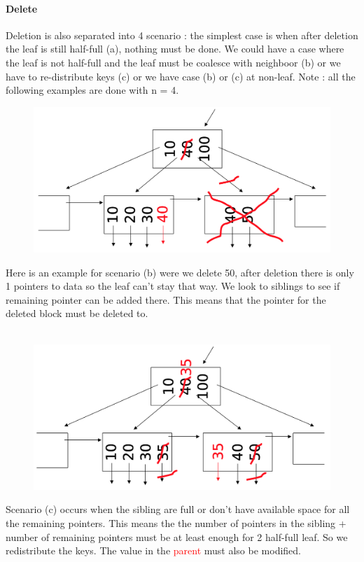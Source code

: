 \documentclass[12pt,a4paper]{article}
\begin{document}
\paragraph{Delete}
Deletion is also separated into 4 scenario : the simplest case is when after deletion the leaf is still half-full (a), nothing must be done. We could have a case where the leaf is not half-full and the leaf must be coalesce with neighboor (b) or we have to re-distribute keys (c) or we have case (b) or (c) at non-leaf. Note : all the following examples are done with n = 4.\\

\begin{figure}
\vspace{-5mm}
\includegraphics[scale=0.29]{img/img40.png}
\end{figure}
Here is an example for scenario (b) were we delete 50, after deletion there is only 1 pointers to data so the leaf can't stay that way. We look to siblings to see if remaining pointer can be added there. This means that the pointer for the deleted block must be deleted to.\\
\\

\begin{figure}
\vspace{-5mm}
\includegraphics[scale=0.29]{img/img41.png}
\end{figure}
Scenario (c) occurs when the sibling are full or don't have available space for all the remaining pointers. This means the the number of pointers in the sibling + number of remaining pointers must be at least enough for 2 half-full leaf. So we redistribute the keys. The value in the \textcolor{red}{parent} must also be modified.\\
\\
\end{document}
